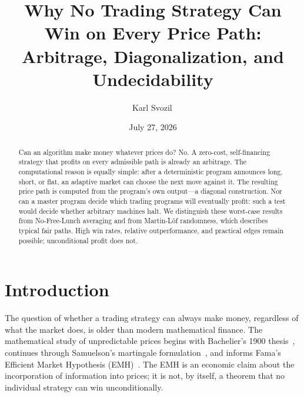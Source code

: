 \documentclass[aps,pra,reprint,superscriptaddress,amsmath,amssymb,floatfix]{revtex4-2}
\theoremstyle{plain}
\theoremstyle{definition}
\theoremstyle{remark}
\begin{document}
\title{Why No Trading Strategy Can Win on Every Price Path:\\
Arbitrage, Diagonalization, and Undecidability}

\author{Karl Svozil\,}

\date{July 27, 2026}

\begin{abstract}
Can an algorithm make money whatever prices do? No. A zero-cost,
self-financing strategy that profits on every admissible path is already an
arbitrage. The computational reason is equally simple: after a deterministic
program announces long, short, or flat, an adaptive market can choose the next
move against it. The resulting price path is computed from the program's own
output---a diagonal construction. Nor can a master program decide which
trading programs will eventually profit: such a test would decide whether
arbitrary machines halt. We distinguish these worst-case results from
No-Free-Lunch averaging and from Martin-L\"of randomness, which describes
typical fair paths. High win rates, relative outperformance, and practical
edges remain possible; unconditional profit does not.
\end{abstract}

\maketitle

\section{Introduction}
\label{sec:intro}

The question of whether a trading strategy can always make money, regardless
of what the market does, is older than modern mathematical finance. The
mathematical study of unpredictable prices begins with Bachelier's 1900
thesis~\cite{Bachelier1900}, continues through Samuelson's martingale
formulation~\cite{Samuelson1965}, and informs Fama's Efficient Market
Hypothesis (EMH)~\cite{Fama1970}. The EMH is an economic claim about the
incorporation of information into prices; it is not, by itself, a theorem that
no individual strategy can win unconditionally.
\end{document}
